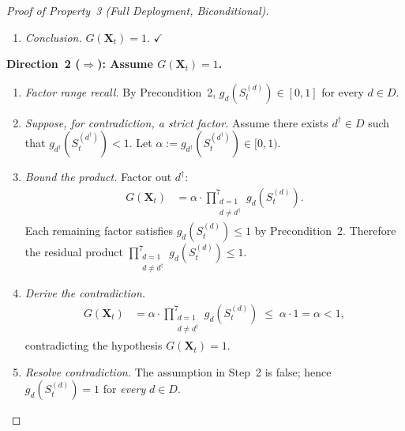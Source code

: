 \documentclass[12pt,openany]{book}
\numberwithin{equation}{chapter}
\theoremstyle{plain}
\theoremstyle{definition}
\theoremstyle{remark}
\def\mathcal#1{#1}%
\begin{document}
\begin{proof}[Proof of Property~3 (Full Deployment, Biconditional)]
\begin{enumerate}
  \item \emph{Conclusion.}
        $G(\mathbf{X}_t)=1$. \hfill$\checkmark$
\end{enumerate}

\medskip
\noindent
\textbf{Direction~2 ($\Rightarrow$): Assume
$G(\mathbf{X}_t)=1$.}
\begin{enumerate}
  \item \emph{Factor range recall.}
        By Precondition~2,
        $g_d\!\left(\mathcal{S}_t^{(d)}\right)\in[0,1]$
        for every $d\in\mathcal{D}$.

  \item \emph{Suppose, for contradiction, a strict factor.}
        Assume there exists $d^{\dagger}\in\mathcal{D}$
        such that
        $g_{d^{\dagger}}\!\left(\mathcal{S}_t^{(d^{\dagger})}\right)
         < 1$.
        Let $\alpha :=
          g_{d^{\dagger}}\!\left(\mathcal{S}_t^{(d^{\dagger})}\right)
          \in [0,1)$.

  \item \emph{Bound the product.}
        Factor out $d^{\dagger}$:
        \begin{align}
          G(\mathbf{X}_t)
          &= \alpha
             \cdot
             \prod_{\substack{d=1\\d \neq d^{\dagger}}}^{7}
               g_d\!\left(\mathcal{S}_t^{(d)}\right).
          \label{eq:P3-fwd-factor}
        \end{align}
        Each remaining factor satisfies
        $g_d\!\left(\mathcal{S}_t^{(d)}\right)\leq 1$
        by Precondition~2.
        Therefore the residual product
        $\prod_{\substack{d=1\\d\neq d^{\dagger}}}^{7}
           g_d\!\left(\mathcal{S}_t^{(d)}\right)\leq 1$.

  \item \emph{Derive the contradiction.}
        \begin{align}
          G(\mathbf{X}_t)
          &= \alpha
             \cdot
             \prod_{\substack{d=1\\d \neq d^{\dagger}}}^{7}
               g_d\!\left(\mathcal{S}_t^{(d)}\right)
          \;\leq\; \alpha \cdot 1
          = \alpha < 1,
          \label{eq:P3-fwd-contra}
        \end{align}
        contradicting the hypothesis $G(\mathbf{X}_t)=1$.

  \item \emph{Resolve contradiction.}
        The assumption in Step~2 is false; hence
        $g_d\!\left(\mathcal{S}_t^{(d)}\right)=1$
        for \emph{every} $d\in\mathcal{D}$.


\end{enumerate}
\end{proof}
\end{document}
